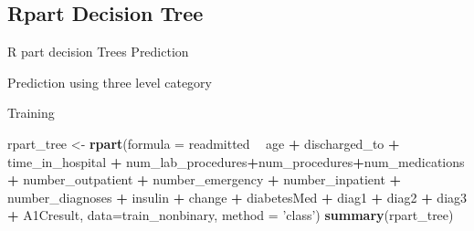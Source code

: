 \documentclass[]{article}
\newenvironment{Shaded}{\begin{snugshade}}{\end{snugshade}}
\newcommand{\KeywordTok}[1]{\textcolor[rgb]{0.13,0.29,0.53}{\textbf{#1}}}
\newcommand{\DataTypeTok}[1]{\textcolor[rgb]{0.13,0.29,0.53}{#1}}
\newcommand{\StringTok}[1]{\textcolor[rgb]{0.31,0.60,0.02}{#1}}
\newcommand{\OperatorTok}[1]{\textcolor[rgb]{0.81,0.36,0.00}{\textbf{#1}}}
\newcommand{\NormalTok}[1]{#1}
\begin{document}
\subsection{Rpart Decision Tree}\label{rpart-decision-tree}

R part decision Trees Prediction

Prediction using three level category

Training

\begin{Shaded}
\begin{Highlighting}[]
\NormalTok{rpart_tree <-}\StringTok{ }\KeywordTok{rpart}\NormalTok{(}\DataTypeTok{formula =}\NormalTok{ readmitted }\OperatorTok{~}\StringTok{ }\NormalTok{age }\OperatorTok{+}\StringTok{ }\NormalTok{discharged_to }\OperatorTok{+}\StringTok{ }\NormalTok{time_in_hospital }\OperatorTok{+}
\StringTok{                      }\NormalTok{num_lab_procedures}\OperatorTok{+}\NormalTok{num_procedures}\OperatorTok{+}\NormalTok{num_medications  }\OperatorTok{+}\StringTok{         }\NormalTok{number_outpatient }\OperatorTok{+}\StringTok{ }\NormalTok{number_emergency }\OperatorTok{+}\StringTok{ }\NormalTok{number_inpatient }\OperatorTok{+}\StringTok{ }\NormalTok{number_diagnoses }\OperatorTok{+}
\StringTok{                      }\NormalTok{insulin }\OperatorTok{+}\StringTok{ }\NormalTok{change }\OperatorTok{+}\StringTok{ }\NormalTok{diabetesMed }\OperatorTok{+}\StringTok{ }\NormalTok{diag1 }\OperatorTok{+}\StringTok{ }\NormalTok{diag2 }\OperatorTok{+}\StringTok{ }\NormalTok{diag3 }\OperatorTok{+}\StringTok{ }\NormalTok{A1Cresult, }
                    \DataTypeTok{data=}\NormalTok{train_nonbinary, }\DataTypeTok{method =} \StringTok{'class'}\NormalTok{)}
\KeywordTok{summary}\NormalTok{(rpart_tree)}
\end{Highlighting}
\end{Shaded}
\end{document}
